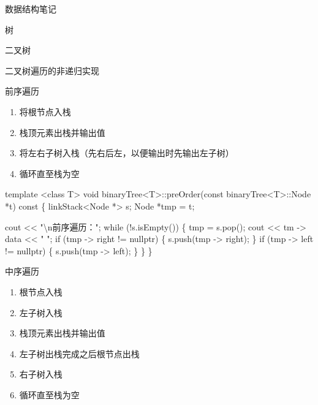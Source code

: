 \documentclass[
  ignorenonframetext,
]{beamer}
\newenvironment{Shaded}{}{}
\newcommand{\NormalTok}[1]{#1}
\providecommand{\tightlist}{%
  \setlength{\itemsep}{0pt}\setlength{\parskip}{0pt}}
\begin{document}
\begin{frame}[fragile]{数据结构笔记}
\begin{block}{树}
\begin{block}{二叉树}
\begin{block}{二叉树遍历的非递归实现}
\protect{}\label{ux4e8cux53c9ux6811ux904dux5386ux7684ux975eux9012ux5f52ux5b9eux73b0}
\begin{block}{前序遍历}
\protect{}\label{ux524dux5e8fux904dux5386-2}
\begin{enumerate}
\tightlist
\item
  将根节点入栈
\item
  栈顶元素出栈并输出值
\item
  将左右子树入栈（先右后左，以便输出时先输出左子树）
\item
  循环直至栈为空
\end{enumerate}

\begin{Shaded}
\begin{Highlighting}[]
\NormalTok{template \textless{}class T\textgreater{}}
\NormalTok{void binaryTree\textless{}T\textgreater{}::preOrder(const binaryTree\textless{}T\textgreater{}::Node *t) const}
\NormalTok{\{}
\NormalTok{  linkStack\textless{}Node *\textgreater{} s;}
\NormalTok{  Node *tmp = t;}

\NormalTok{  cout \textless{}\textless{} "\textbackslash{}n前序遍历：";}
\NormalTok{  while (!s.isEmpty())}
\NormalTok{  \{}
\NormalTok{    tmp = s.pop();}
\NormalTok{    cout \textless{}\textless{} tm {-}\textgreater{} data \textless{}\textless{} " ";}
\NormalTok{    if (tmp {-}\textgreater{} right != nullptr)}
\NormalTok{    \{}
\NormalTok{      s.push(tmp {-}\textgreater{} right);}
\NormalTok{    \}}
\NormalTok{    if (tmp {-}\textgreater{} left != nullptr)}
\NormalTok{    \{}
\NormalTok{      s.push(tmp {-}\textgreater{} left);}
\NormalTok{    \}}
\NormalTok{  \}}
\NormalTok{\}}
\end{Highlighting}
\end{Shaded}
\end{block}

\begin{block}{中序遍历}
\protect{}\label{ux4e2dux5e8fux904dux5386-2}
\begin{enumerate}
\tightlist
\item
  根节点入栈
\item
  左子树入栈
\item
  栈顶元素出栈并输出值
\item
  左子树出栈完成之后根节点出栈
\item
  右子树入栈
\item
  循环直至栈为空
\end{enumerate}


\end{block}
\end{block}
\end{block}
\end{block}
\end{frame}
\end{document}
